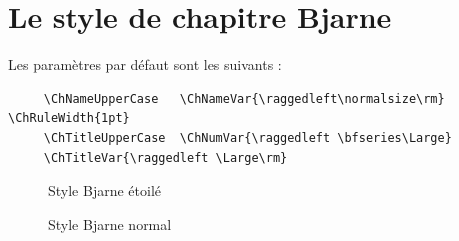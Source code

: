 \documentclass{report}
\begin{document}
    \section{Le style de chapitre Bjarne}
    Les paramètres par défaut sont les suivants :
    {\small\begin{verbatim}
     \ChNameUpperCase   \ChNameVar{\raggedleft\normalsize\rm}   \ChRuleWidth{1pt}
     \ChTitleUpperCase  \ChNumVar{\raggedleft \bfseries\Large} 
     \ChTitleVar{\raggedleft \Large\rm}
    \end{verbatim}}
    \begin{figure}[h]
      \begin{minipage}{7 cm}
        \centerline{\color{gray!25}}
        \caption{Style Bjarne \og étoilé \fg{}}
      \end{minipage}\hfill
      \begin{minipage}{7 cm}
        \centerline{\color{gray!25}}
        \caption{Style Bjarne \og normal \fg{}}
      \end{minipage}\hfill
    \end{figure}
\end{document}

